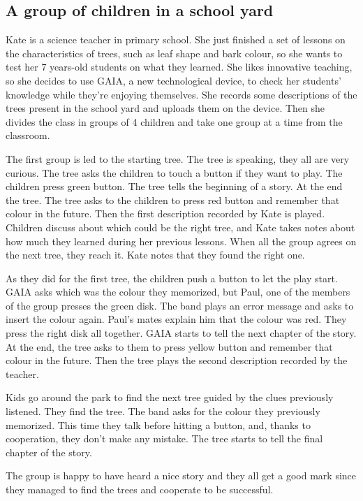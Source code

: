\documentclass[a4paper,11pt]{report}
\begin{document}
\subsection{A group of children in a school yard}
Kate is a science teacher in primary school. She just finished a set of lessons on the characteristics of trees, such as leaf shape and bark colour, so she wants to test her 7 years-old students on what they learned. She likes innovative teaching, so she decides to use GAIA, a new technological device, to check her students' knowledge while they're enjoying themselves. She records some descriptions of the trees present in the school yard and uploads them on the device. Then she divides the class in groups of 4 children and take one group at a time from the classroom.\par 
The first group is led to the starting tree. The tree is speaking, they all are very curious. The tree asks the children to touch a button if they want to play. The children press green button. The tree tells the beginning of a story. At the end the tree. The tree asks to the children to press red button and remember that colour in the future. Then the first description recorded by Kate is played. Children discuss about which could be the right tree, and Kate takes notes about how much they learned during her previous lessons. When all the group agrees on the next tree, they reach it. Kate notes that they found the right one. \par 
As they did for the first tree, the children push a button to let the play start. GAIA asks which was the colour they memorized, but Paul, one of the members of the group presses the green disk. The band plays an error message and asks to insert the colour again. Paul's mates explain him that the colour was red. They press the right disk all together. GAIA starts to tell the next chapter of the story. At the end, the tree asks to them to press yellow button and remember that colour in the future. Then the tree plays the second description recorded by the teacher.\par
Kids go around the park to find the next tree guided by the clues previously listened. They find the tree. The band asks for the colour they previously memorized. This time they talk before hitting a button, and, thanks to cooperation, they don't make any mistake. The tree starts to tell the final chapter of the story.\par
The group is happy to have heard a nice story and they all get a good mark since they managed to find the trees and cooperate to be successful.
\end{document}
